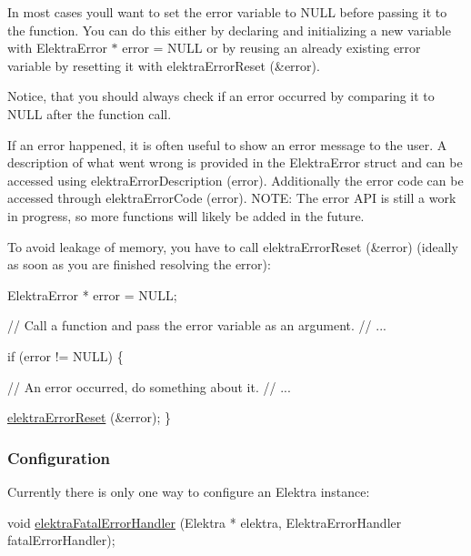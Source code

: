 In most cases you\textquotesingle{}ll want to set the error variable to {\ttfamily N\+U\+LL} before passing it to the function. You can do this either by declaring and initializing a new variable with {\ttfamily Elektra\+Error $\ast$ error = N\+U\+LL} or by reusing an already existing error variable by resetting it with {\ttfamily elektra\+Error\+Reset (\&error)}.

Notice, that you should always check if an error occurred by comparing it to {\ttfamily N\+U\+LL} after the function call.

If an error happened, it is often useful to show an error message to the user. A description of what went wrong is provided in the {\ttfamily Elektra\+Error} struct and can be accessed using {\ttfamily elektra\+Error\+Description (error)}. Additionally the error code can be accessed through {\ttfamily elektra\+Error\+Code (error)}. N\+O\+TE\+: The error A\+PI is still a work in progress, so more functions will likely be added in the future.

To avoid leakage of memory, you have to call {\ttfamily elektra\+Error\+Reset (\&error)} (ideally as soon as you are finished resolving the error)\+:


\begin{DoxyCode}
ElektraError * error = NULL;

\textcolor{comment}{// Call a function and pass the error variable as an argument.}
\textcolor{comment}{// ...}

\textcolor{keywordflow}{if} (error != NULL)
\{

  \textcolor{comment}{// An error occurred, do something about it.}
  \textcolor{comment}{// ...}

  \hyperlink{group__highlevel_ga591f7ed4b57a341928bf7bb3d7adb693}{elektraErrorReset} (&error);
\}
\end{DoxyCode}


\subsubsection*{Configuration}

Currently there is only one way to configure an {\ttfamily Elektra} instance\+:


\begin{DoxyCode}
\textcolor{keywordtype}{void} \hyperlink{group__highlevel_ga496441e9e1dd80ed14a239dfc4c08c40}{elektraFatalErrorHandler} (Elektra * elektra, ElektraErrorHandler 
      fatalErrorHandler);
\end{DoxyCode}


